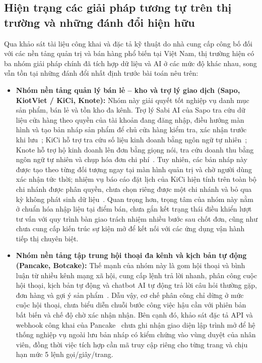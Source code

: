 \subsection{Hiện trạng các giải pháp tương tự trên thị trường và những đánh đổi hiện hữu}
Qua khảo sát tài liệu công khai và đặc tả kỹ thuật do nhà cung cấp công bố đối với các nền tảng quản trị và bán hàng phổ biến tại Việt Nam, thị trường hiện có ba nhóm giải pháp chính đã tích hợp dữ liệu và AI ở các mức độ khác nhau, song vẫn tồn tại những đánh đổi nhất định trước bài toán nêu trên:

\begin{itemize}
  \item \textbf{Nhóm nền tảng quản lý bán lẻ -- kho và trợ lý giao dịch (Sapo, KiotViet / KiCi, Knote):} Nhóm này giải quyết tốt nghiệp vụ danh mục sản phẩm, bán lẻ và tồn kho đa kênh. Trợ lý Sabi AI của Sapo tra cứu dữ liệu cửa hàng theo quyền của tài khoản đang đăng nhập, điều hướng màn hình và tạo bản nháp sản phẩm để chủ cửa hàng kiểm tra, xác nhận trước khi lưu~\cite{sapo-sabi,sapo-restaurant-ai}; KiCi hỗ trợ tra cứu số liệu kinh doanh bằng ngôn ngữ tự nhiên~\cite{kiotviet-kici}; Knote hỗ trợ hộ kinh doanh lên đơn bằng giọng nói, tra cứu doanh thu bằng ngôn ngữ tự nhiên và chụp hóa đơn chi phí~\cite{knote-vneconomy,knote-appstore}. Tuy nhiên, các bản nháp này được tạo theo từng đối tượng ngay tại màn hình quản trị và chờ người dùng xác nhận tức thời; nhiệm vụ báo cáo đặt lịch của KiCi hiện tính trên toàn bộ chi nhánh được phân quyền, chưa chọn riêng được một chi nhánh và bỏ qua kỳ không phát sinh dữ liệu~\cite{kiotviet-kici}. Quan trọng hơn, trọng tâm của nhóm này nằm ở chuẩn hóa nhập liệu tại điểm bán, chưa gắn kết trạng thái điều khiển lượt tư vấn với quy trình bàn giao trách nhiệm nhiều bước sau chốt đơn, cũng như chưa cung cấp kiến trúc sự kiện mở để kết nối với các ứng dụng vận hành tiếp thị chuyên biệt.
  \item \textbf{Nhóm nền tảng tập trung hội thoại đa kênh và kịch bản tự động (Pancake, Botcake):} Thế mạnh của nhóm này là gom hội thoại và bình luận từ nhiều kênh mạng xã hội, cung cấp lệnh trả lời nhanh, phân công cuộc hội thoại, kịch bản tự động và chatbot AI tự động trả lời câu hỏi thường gặp, đơn hàng và gợi ý sản phẩm~\cite{botcake-messenger}. Dẫu vậy, cơ chế phân công chỉ dừng ở mức cuộc hội thoại, chưa biểu diễn chuỗi bước công việc hậu cần với phiên bản bất biến và chế độ chờ xác nhận nhận. Bên cạnh đó, khảo sát đặc tả API và webhook công khai của Pancake~\cite{pancake-api} chưa ghi nhận giao diện lập trình mở để hệ thống nghiệp vụ ngoài lưu bản nháp có kiểm chứng vào vùng duyệt của nhân viên, đồng thời việc tích hợp cần mã truy cập riêng cho từng trang và chịu hạn mức 5 lệnh gọi/giây/trang.

\end{itemize}
